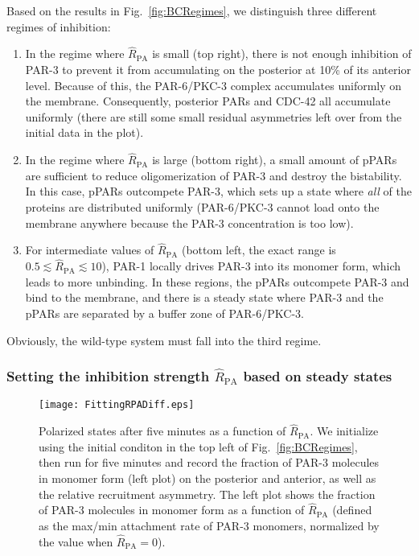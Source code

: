 \documentclass[11pt]{article}
\newcommand{\6}[1]{#1_{\text{6}}}
\newcommand{\3}[1]{#1_{\text{3}}}
\begin{document}
Based on the results in Fig.\ \ref{fig:BCRegimes}, we distinguish three different regimes of inhibition:
\begin{enumerate}
\item In the regime where $\hat R_\text{PA}$ is small (top right), there is not enough inhibition of PAR-3 to prevent it from accumulating on the posterior at 10\% of its anterior level. Because of this, the PAR-6/PKC-3 complex accumulates uniformly on the membrane. Consequently, posterior PARs and CDC-42 all accumulate uniformly (there are still some small residual asymmetries left over from the initial data in the plot). 
\item In the regime where $\hat R_\text{PA}$ is large (bottom right), a small amount of pPARs are sufficient to reduce oligomerization of PAR-3 and destroy the bistability. In this case, pPARs outcompete PAR-3, which sets up a state where \emph{all} of the proteins are distributed uniformly (PAR-6/PKC-3 cannot load onto the membrane anywhere because the PAR-3 concentration is too low). 
\item For intermediate values of $\hat R_\text{PA}$ (bottom left, the exact range is $0.5 \lesssim \hat R_\text{PA} \lesssim 10$), PAR-1 locally drives PAR-3 into its monomer form, which leads to more unbinding. In these regions, the pPARs outcompete PAR-3 and bind to the membrane, and there is a steady state where PAR-3 and the pPARs are separated by a buffer zone of PAR-6/PKC-3.
\end{enumerate}
Obviously, the wild-type system must fall into the third regime.

\subsubsection{Setting the inhibition strength $\hat R_\text{PA}$ based on steady states}

\begin{figure}
\centering
\texttt{[image: FittingRPADiff.eps]}
\caption{\label{fig:BCSS}Polarized states after five minutes as a function of $\hat R_\text{PA}$. We initialize using the initial conditon in the top left of Fig.\ \ref{fig:BCRegimes}, then run for five minutes and record the fraction of PAR-3 molecules in monomer form (left plot) on the posterior and anterior, as well as the relative recruitment asymmetry. The left plot shows the fraction of PAR-3 molecules in monomer form as a function of $\hat R_\text{PA}$ (defined as the max/min attachment rate of PAR-3 monomers, normalized by the value when $\hat R_\text{PA}=0$).}
\end{figure}
\end{document}
